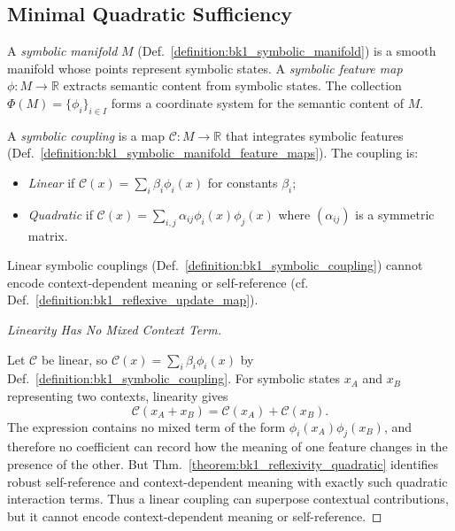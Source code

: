 \subsection{Minimal Quadratic Sufficiency}
\label{subsec:bk1_minimal_quadratic_sufficiency}

\begin{definition}
\label{definition:bk1_symbolic_manifold_feature_maps}
A \emph{symbolic manifold} $M$ (Def.~\ref{definition:bk1_symbolic_manifold}) is a smooth manifold whose points represent symbolic states. A \emph{symbolic feature map} $\phi: M \to \mathbb{R}$ extracts semantic content from symbolic states. The collection $\Phi(M) = \{\phi_i\}_{i \in I}$ forms a coordinate system for the semantic content of $M$.
\end{definition}

\begin{definition}
\label{definition:bk1_symbolic_coupling}
A \emph{symbolic coupling} is a map $\mathcal{C}: M \to \mathbb{R}$ that integrates symbolic features (Def.~\ref{definition:bk1_symbolic_manifold_feature_maps}). The coupling is:
\begin{itemize}
  \item \emph{Linear} if $\mathcal{C}(x) = \sum_i \beta_i \phi_i(x)$ for constants $\beta_i$;
  \item \emph{Quadratic} if $\mathcal{C}(x) = \sum_{i,j} \alpha_{ij} \phi_i(x)\phi_j(x)$ where $(\alpha_{ij})$ is a symmetric matrix.
\end{itemize}
\end{definition}

\begin{lemma}
\label{lemma:bk1_linear_context_independence}
Linear symbolic couplings (Def.~\ref{definition:bk1_symbolic_coupling}) cannot encode context-dependent meaning or self-reference (cf. Def.~\ref{definition:bk1_reflexive_update_map}).
\end{lemma}
\begin{proof}[Linearity Has No Mixed Context Term]
\label{proof:bk1_linear_context_independence}
\leavevmode

Let \(\mathcal{C}\) be linear, so
\(\mathcal{C}(x)=\sum_i\beta_i\phi_i(x)\) by
Def.~\ref{definition:bk1_symbolic_coupling}. For symbolic states \(x_A\) and
\(x_B\) representing two contexts, linearity gives
\[
\mathcal{C}(x_A+x_B)=\mathcal{C}(x_A)+\mathcal{C}(x_B).
\]
The expression contains no mixed term of the form
\(\phi_i(x_A)\phi_j(x_B)\), and therefore no coefficient can record how the
meaning of one feature changes in the presence of the other. But
Thm.~\ref{theorem:bk1_reflexivity_quadratic} identifies robust self-reference
and context-dependent meaning with exactly such quadratic interaction terms.
Thus a linear coupling can superpose contextual contributions, but it cannot
encode context-dependent meaning or self-reference.
\end{proof}

